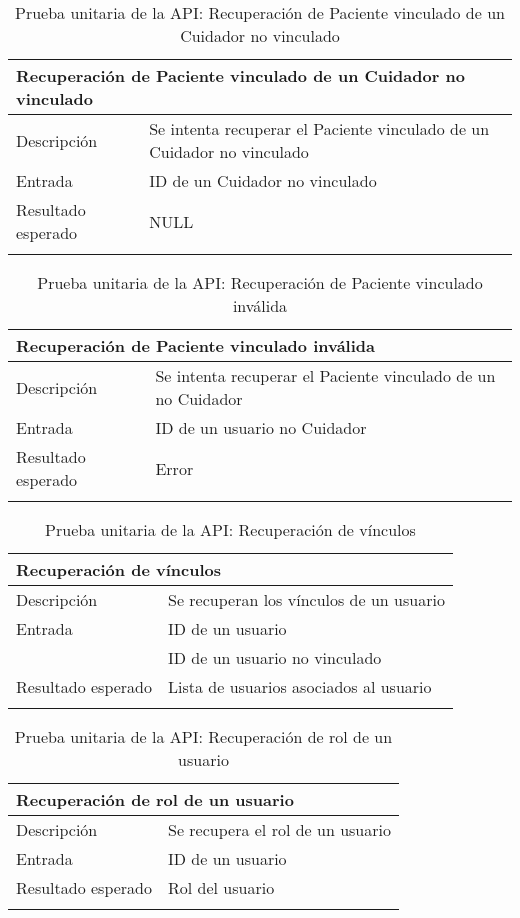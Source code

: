 \newpage
\begin{longtable}{|p{} p{}|}
    \hline
    \multicolumn{2}{|l|}{\textbf{Recuperación de Paciente vinculado de un Cuidador no vinculado}} \\ \hline 
    Descripción                 & Se intenta recuperar el Paciente vinculado de un Cuidador no vinculado \\ \hline
    Entrada                     & ID de un Cuidador no vinculado \\ \hline
    Resultado esperado          & NULL \\  \hline
    \caption{Prueba unitaria de la API: Recuperación de Paciente vinculado de un Cuidador no vinculado}
    \label{cp:u:api:recuperar_cared_no_vinculo}
\end{longtable}

\begin{longtable}{|p{} p{}|}
    \hline
    \multicolumn{2}{|l|}{\textbf{Recuperación de Paciente vinculado inválida}} \\ \hline 
    Descripción                 & Se intenta recuperar el Paciente vinculado de un no Cuidador \\ \hline
    Entrada                     & ID de un usuario no Cuidador \\ \hline
    Resultado esperado          & Error \\  \hline
    \caption{Prueba unitaria de la API: Recuperación de Paciente vinculado inválida}
    \label{cp:u:api:recuperar_cared_invalido}
\end{longtable}

\begin{longtable}{|p{} p{}|}
    \hline
    \multicolumn{2}{|l|}{\textbf{Recuperación de vínculos}} \\ \hline 
    Descripción                 & Se recuperan los vínculos de un usuario \\ \hline
    Entrada                     & ID de un usuario \\
                                & ID de un usuario no vinculado \\ \hline
    Resultado esperado          & Lista de usuarios asociados al usuario \\  \hline
    \caption{Prueba unitaria de la API: Recuperación de vínculos}
    \label{cp:u:api:recuperar_vinculos}
\end{longtable}

\begin{longtable}{|p{} p{}|}
    \hline
    \multicolumn{2}{|l|}{\textbf{Recuperación de rol de un usuario}} \\ \hline 
    Descripción                 & Se recupera el rol de un usuario \\ \hline
    Entrada                     & ID de un usuario  \\ \hline
    Resultado esperado          & Rol del usuario \\  \hline
    \caption{Prueba unitaria de la API: Recuperación de rol de un usuario}
    \label{cp:u:api:recuperar_rol}
\end{longtable}